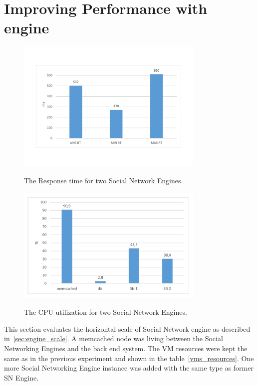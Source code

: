 \section{Improving Performance with engine}

\begin{figure}[h]
	\caption{The Response time for two Social Network Engines.}
	\includegraphics[width=0.8\textwidth,natwidth=200,natheight=150]{./fig/RT2SN.pdf}
	\centering
	\label{fig:rt2SN}
\end{figure}

\begin{figure}[h]
	\caption{The CPU utilization for two Social Network Engines.}
	\includegraphics[width=0.8\textwidth,natwidth=200,natheight=150]{./fig/Usage2SN.pdf}
	\centering
	\label{fig:cpu2SNavg}
\end{figure}

This section evaluates the horizontal scale of Social Network engine as described in~\ref{sec:engine_scale}. A memcached node was living between the Social Networking Engines and the back end system. The VM resources were kept the same as in the previous experiment and shown in the table~\ref{vms_resources}. One more Social Networking Engine instance was added with the same type as former SN Engine. 


